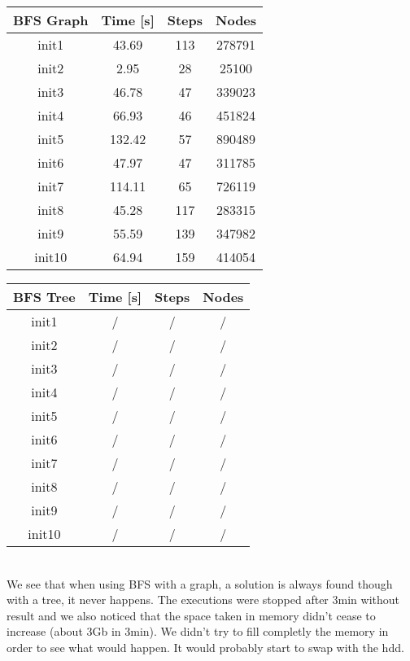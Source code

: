 \documentclass[a4paper,10pt]{article}
\begin{document}
	\vspace{0.5cm}
	\begin{tabular}{|c||c|c|c|}
		\hline 
		\textbf{BFS Graph} & \textbf{Time [s]} & \textbf{Steps} & \textbf{Nodes} \\ 
		\hline 
		init1 & 43.69 & 113 & 278791 \\ 
		\hline 
		init2 & 2.95 & 28 & 25100 \\ 
		\hline 
		init3 & 46.78 & 47 & 339023 \\ 
		\hline 
		init4 & 66.93 & 46 & 451824 \\ 
		\hline 
		init5 & 132.42 & 57 & 890489 \\ 
		\hline 
		init6 & 47.97 & 47 & 311785 \\ 
		\hline 
		init7 & 114.11 & 65 & 726119 \\ 
		\hline 
		init8 & 45.28 & 117 & 283315 \\ 
		\hline 
		init9 & 55.59 & 139 & 347982 \\ 
		\hline
		init10 & 64.94 & 159 & 414054 \\ 
		\hline 
	\end{tabular}
	\hspace{0.5cm}
	\begin{tabular}{|c||c|c|c|}
		\hline 
		\textbf{BFS Tree} & \textbf{Time [s]} & \textbf{Steps} & \textbf{Nodes} \\ 
		\hline 
		init1 & / & / & / \\ 
		\hline 
		init2 & / & / & / \\ 
		\hline 
		init3 & / & / & / \\ 
		\hline 
		init4 & / & / & / \\ 
		\hline 
		init5 & / & / & / \\ 
		\hline 
		init6 & / & / & / \\ 
		\hline 
		init7 & / & / & / \\ 
		\hline 
		init8 & / & / & / \\ 
		\hline 
		init9 & / & / & / \\ 
		\hline 
		init10 & / & / & / \\ 
		\hline 
	\end{tabular}
	\vspace{0.5cm}\\
	We see that when using BFS with a graph, a solution is always found though with a tree, it never happens. The executions were stopped after 3min without result and we also noticed that the space taken in memory didn't cease to increase (about 3Gb in 3min). We didn't try to fill completly the memory in order to see what would happen. It would probably start to swap with the hdd.
	\vspace{1cm}
	
\end{document}
